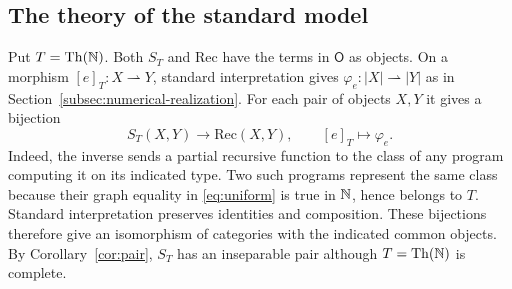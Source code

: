 \subsection{The theory of the standard model}

Put $T=\operatorname{Th}(\mathbb N)$. Both $S_T$ and $\mathrm{Rec}$ have
the terms in $\mathsf O$ as objects. On a morphism $[e]_T:X\rightharpoonup Y$,
standard interpretation gives $\varphi_e:|X|\rightharpoonup|Y|$ as in
Section~\ref{subsec:numerical-realization}.
For each pair of objects $X,Y$ it gives a bijection
\[
 S_T(X,Y)\longrightarrow\mathrm{Rec}(X,Y),\qquad
 [e]_T\longmapsto\varphi_e .
\]
Indeed, the inverse sends a partial recursive function to the class
of any program computing it on its indicated type. Two such programs
represent the same class because their graph equality in
\eqref{eq:uniform} is true in $\mathbb N$, hence belongs to $T$.
Standard interpretation preserves identities and composition.
These bijections therefore give an isomorphism of categories with
the indicated common objects.
By Corollary~\ref{cor:pair}, $S_T$ has an inseparable pair although
$T=\operatorname{Th}(\mathbb N)$ is complete.


